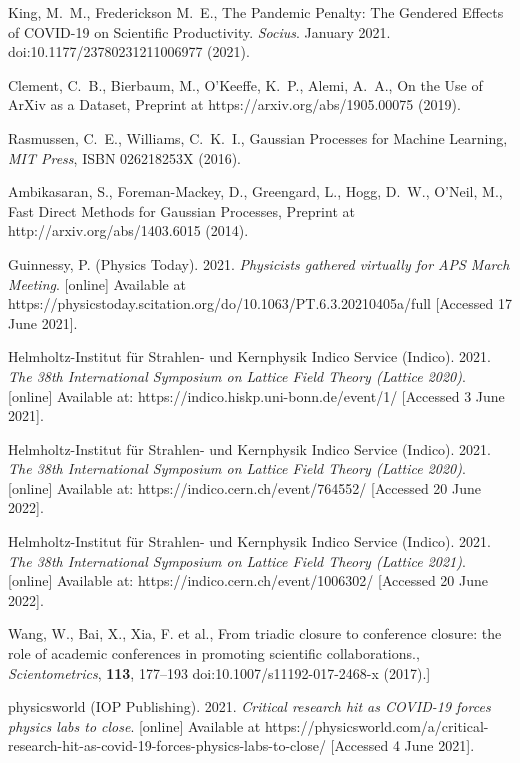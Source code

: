 \documentclass[]{rsos}%
\begin{document}
\begin{thebibliography}{10}
{King, M.~M., Frederickson M.~E.}, {The Pandemic Penalty: The Gendered Effects of COVID-19 on Scientific Productivity}. \emph{Socius}. January 2021. doi:10.1177/23780231211006977 \newblock (2021).  


{Clement, C.~B., Bierbaum, M., O'Keeffe, K.~P., Alemi, A.~A.,}
{On the Use of ArXiv as a Dataset},
Preprint at https://arxiv.org/abs/1905.00075 \newblock (2019).

{Rasmussen, C.~E., Williams, C.~K.~I.,}
{Gaussian Processes for Machine Learning}, \emph{MIT Press}, ISBN 026218253X \newblock (2016).

{Ambikasaran, S., Foreman-Mackey, D., Greengard, L., Hogg, D.~W., O'Neil, M.,}
{Fast Direct Methods for Gaussian Processes}, Preprint at http://arxiv.org/abs/1403.6015 \newblock (2014).

Guinnessy, P. (Physics Today). 2021. \emph{Physicists gathered virtually for APS March Meeting}. [online] Available at {https://physicstoday.scitation.org/do/10.1063/PT.6.3.20210405a/full} [Accessed 17 June 2021].
 
Helmholtz-Institut f\"ur Strahlen- und Kernphysik Indico Service (Indico). 2021. \emph{The 38th International Symposium on Lattice Field Theory (Lattice 2020)}. [online] Available at: {https://indico.hiskp.uni-bonn.de/event/1/} [Accessed 3 June 2021].

Helmholtz-Institut f\"ur Strahlen- und Kernphysik Indico Service (Indico). 2021. \emph{The 38th International Symposium on Lattice Field Theory (Lattice 2020)}. [online] Available at: {https://indico.cern.ch/event/764552/} [Accessed 20 June 2022].

Helmholtz-Institut f\"ur Strahlen- und Kernphysik Indico Service (Indico). 2021. \emph{The 38th International Symposium on Lattice Field Theory (Lattice 2021)}. [online] Available at: {https://indico.cern.ch/event/1006302/} [Accessed 20 June 2022].

{Wang, W., Bai, X., Xia, F. et al.}, {From triadic closure to conference closure: the role of academic conferences in promoting scientific collaborations.}, \emph{Scientometrics}, \textbf{113}, 177–193  doi:10.1007/s11192-017-2468-x \newblock (2017).]

physicsworld (IOP Publishing). 2021. \emph{Critical research hit as COVID-19 forces physics labs to close}. [online] Available at {https://physicsworld.com/a/critical-research-hit-as-covid-19-forces-physics-labs-to-close/} [Accessed 4 June 2021].



\end{thebibliography}
\end{document}
